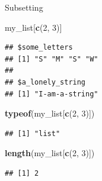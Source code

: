 \documentclass[ignorenonframetext,]{beamer}
\newenvironment{Shaded}{\begin{snugshade}}{\end{snugshade}}
\newcommand{\DecValTok}[1]{\textcolor[rgb]{0.00,0.00,0.81}{#1}}
\newcommand{\KeywordTok}[1]{\textcolor[rgb]{0.13,0.29,0.53}{\textbf{#1}}}
\newcommand{\NormalTok}[1]{#1}
\begin{document}
\begin{frame}[fragile]{Subsetting}
\protect\hypertarget{subsetting-7}{}

\begin{Shaded}
\begin{Highlighting}[]
\NormalTok{my_list[}\KeywordTok{c}\NormalTok{(}\DecValTok{2}\NormalTok{, }\DecValTok{3}\NormalTok{)] }
\end{Highlighting}
\end{Shaded}

\begin{verbatim}
## $some_letters
## [1] "S" "M" "S" "W"
## 
## $a_lonely_string
## [1] "I-am-a-string"
\end{verbatim}

\begin{Shaded}
\begin{Highlighting}[]
\KeywordTok{typeof}\NormalTok{(my_list[}\KeywordTok{c}\NormalTok{(}\DecValTok{2}\NormalTok{, }\DecValTok{3}\NormalTok{)]) }
\end{Highlighting}
\end{Shaded}

\begin{verbatim}
## [1] "list"
\end{verbatim}

\begin{Shaded}
\begin{Highlighting}[]
\KeywordTok{length}\NormalTok{(my_list[}\KeywordTok{c}\NormalTok{(}\DecValTok{2}\NormalTok{, }\DecValTok{3}\NormalTok{)])}
\end{Highlighting}
\end{Shaded}

\begin{verbatim}
## [1] 2
\end{verbatim}

\end{frame}
\end{document}
